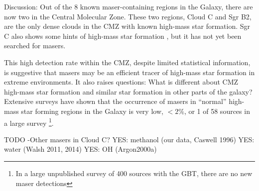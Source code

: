 Discussion:
Out of the 8 known maser-containing regions in the Galaxy, there are now two in
the Central Molecular Zone.  These two regions, Cloud C and Sgr B2, are the only
dense clouds in the CMZ with known high-mass star formation.  Sgr C also shows
some hints of high-mass star formation \citep{Kendrew2013a}, but it has not yet
been searched for \formaldehyde masers.

This high detection rate within the CMZ, despite limited statistical
information, is suggestive that \formaldehyde masers may be an efficient tracer
of high-mass star formation in extreme environments.
It also raises questions: What is different about CMZ high-mass star formation and
similar star formation in other parts of the galaxy?  Extensive surveys have shown
that the occurrence of \formaldehyde masers in ``normal'' high-mass star
forming regions in the Galaxy is very low, $<2\%$, or 1 of 58 sources in a
large survey \citep{Araya2004a,Araya2007b,Araya2008a}\footnote{In a large unpublished survey
of 400 sources with the GBT, there are no new maser detections}.  

TODO
-Other masers in Cloud C?
  YES: methanol (our data, Caswell 1996)
  YES: water (Walsh 2011, 2014)
  YES: OH (Argon2000a)
